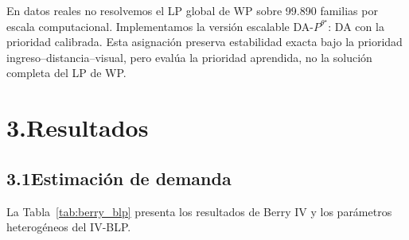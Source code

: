 \documentclass[12pt,a4paper]{article}
\begin{document}
En datos reales no resolvemos el LP global de WP sobre 99{.}890 familias por
escala computacional. Implementamos la versión escalable DA-$P^{\theta^\star}$:
DA con la prioridad calibrada. Esta asignación preserva estabilidad exacta bajo
la prioridad ingreso--distancia--visual, pero evalúa la prioridad aprendida, no
la solución completa del LP de WP.


\section*{3.\quad Resultados}

\subsection*{3.1\quad Estimación de demanda}

La Tabla~\ref{tab:berry_blp} presenta los resultados de Berry IV y los
parámetros heterogéneos del IV-BLP.
\end{document}
